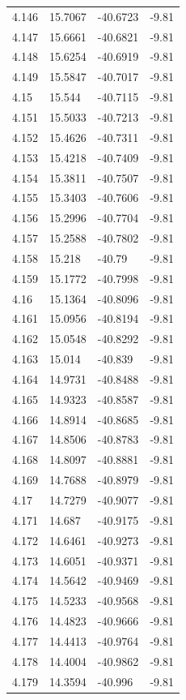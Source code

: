 \begin{tabular}{llll}
4.146 & 15.7067 & -40.6723 & -9.81 \\
4.147 & 15.6661 & -40.6821 & -9.81 \\
4.148 & 15.6254 & -40.6919 & -9.81 \\
4.149 & 15.5847 & -40.7017 & -9.81 \\
4.15 & 15.544 & -40.7115 & -9.81 \\
4.151 & 15.5033 & -40.7213 & -9.81 \\
4.152 & 15.4626 & -40.7311 & -9.81 \\
4.153 & 15.4218 & -40.7409 & -9.81 \\
4.154 & 15.3811 & -40.7507 & -9.81 \\
4.155 & 15.3403 & -40.7606 & -9.81 \\
4.156 & 15.2996 & -40.7704 & -9.81 \\
4.157 & 15.2588 & -40.7802 & -9.81 \\
4.158 & 15.218 & -40.79 & -9.81 \\
4.159 & 15.1772 & -40.7998 & -9.81 \\
4.16 & 15.1364 & -40.8096 & -9.81 \\
4.161 & 15.0956 & -40.8194 & -9.81 \\
4.162 & 15.0548 & -40.8292 & -9.81 \\
4.163 & 15.014 & -40.839 & -9.81 \\
4.164 & 14.9731 & -40.8488 & -9.81 \\
4.165 & 14.9323 & -40.8587 & -9.81 \\
4.166 & 14.8914 & -40.8685 & -9.81 \\
4.167 & 14.8506 & -40.8783 & -9.81 \\
4.168 & 14.8097 & -40.8881 & -9.81 \\
4.169 & 14.7688 & -40.8979 & -9.81 \\
4.17 & 14.7279 & -40.9077 & -9.81 \\
4.171 & 14.687 & -40.9175 & -9.81 \\
4.172 & 14.6461 & -40.9273 & -9.81 \\
4.173 & 14.6051 & -40.9371 & -9.81 \\
4.174 & 14.5642 & -40.9469 & -9.81 \\
4.175 & 14.5233 & -40.9568 & -9.81 \\
4.176 & 14.4823 & -40.9666 & -9.81 \\
4.177 & 14.4413 & -40.9764 & -9.81 \\
4.178 & 14.4004 & -40.9862 & -9.81 \\
4.179 & 14.3594 & -40.996 & -9.81 \\

\end{tabular}

